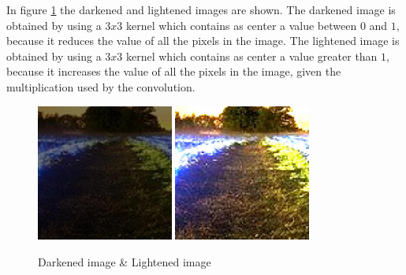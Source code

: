     In figure \ref{fig:darken_lighten} the darkened and lightened images are shown. 
    The darkened image is obtained by using a $3x3$ kernel which contains as center a value between $0$ and $1$, 
    because it reduces the value of all the pixels in the image. The lightened image is obtained by using a $3x3$ kernel which contains as center a value greater than $1$,
    because it increases the value of all the pixels in the image, given the multiplication used by the convolution.
    \begin{figure}[h]
        \centering
        \includegraphics[width=0.4\textwidth]{img/darken_lighten/final_darken.jpg}
        \includegraphics[width=0.4\textwidth]{img/darken_lighten/final_lighten.jpg}
        \caption{Darkened image \& Lightened image}
        \label{fig:darken_lighten}
    \end{figure}

